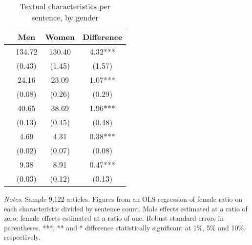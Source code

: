 \begin{table}
    \footnotesize
    \centering
    \begin{threeparttable}
        \caption{Textual characteristics per sentence, by gender}
        \label{table3}
        \begin{tabular}{p{4cm}S@{}S@{}S@{}}
            \toprule
            &{Men}&{Women}&{Difference}\\
            \midrule
                &      134.72&      130.40&        4.32***\\
                                          &      (0.43)&      (1.45)&      (1.57)   \\
                     &       24.16&       23.09&        1.07***\\
                                          &      (0.08)&      (0.26)&      (0.29)   \\
                 &       40.65&       38.69&        1.96***\\
                                          &      (0.13)&      (0.45)&      (0.48)   \\
            &        4.69&        4.31&        0.38***\\
                                          &      (0.02)&      (0.07)&      (0.08)   \\
            &        9.38&        8.91&        0.47***\\
                                          &      (0.03)&      (0.12)&      (0.13)   \\
            \bottomrule
        \end{tabular}
        \begin{tablenotes}
            \tiny
            \item \textit{Notes}. Sample 9,122 articles. Figures from an OLS regression of female ratio on each characteristic divided by sentence count. Male effects estimated at a ratio of zero; female effects estimated at a ratio of one. Robust standard errors in parentheses. ***, ** and * difference statistically significant at 1\%, 5\% and 10\%, respectively.
        \end{tablenotes}
    \end{threeparttable}
\end{table}